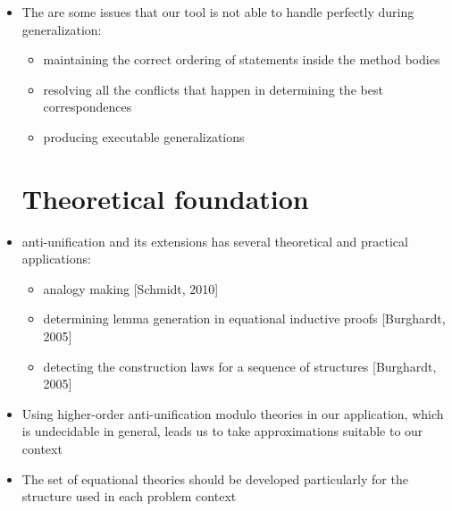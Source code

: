 \begin{itemize} [leftmargin=.01in]
\item The are some issues that our tool is not able to handle perfectly during generalization:
\begin{itemize} [leftmargin=.3in]
\item maintaining the correct ordering of statements inside the method bodies
\item resolving all the conflicts that happen in determining the best correspondences
\item producing executable generalizations
\end{itemize}
\section{Theoretical foundation}  \label{theory}
\item anti-unification and its extensions has several theoretical and practical applications:
\begin{itemize} [leftmargin=.3in]
\item analogy making [Schmidt, 2010]
\item determining lemma generation in equational inductive proofs [Burghardt, 2005]
\item detecting the construction laws for a sequence of structures [Burghardt, 2005]
\end{itemize}
\item Using higher-order anti-unification modulo theories in our application, which is undecidable in general, leads us to take approximations suitable to our context
\item The set of equational theories should be developed particularly for the structure used in each problem context
\end{itemize} 